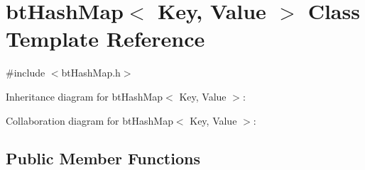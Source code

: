 \hypertarget{classbt_hash_map}{\section{bt\+Hash\+Map$<$ Key, Value $>$ Class Template Reference}
\label{classbt_hash_map}
}


{\ttfamily \#include $<$bt\+Hash\+Map.\+h$>$}



Inheritance diagram for bt\+Hash\+Map$<$ Key, Value $>$\+:


Collaboration diagram for bt\+Hash\+Map$<$ Key, Value $>$\+:
\subsection*{Public Member Functions}
